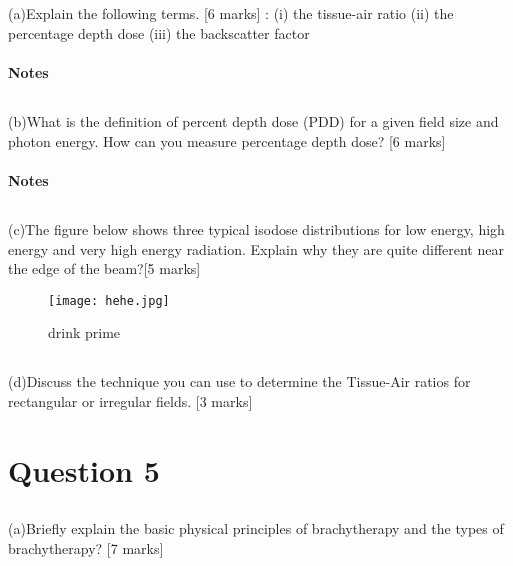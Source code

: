 \documentclass[11pt,letterpaper]{article}
\begin{document}
\subsection*{}(a)Explain the following terms. [6 marks] :
(i) the tissue-air ratio (ii) the percentage depth dose (iii) the backscatter factor

\paragraph*{Notes}
\subsection*{}(b)What is the definition of percent depth dose (PDD) for a given field size and photon energy.
How can you measure percentage depth dose? [6 marks]

\paragraph*{Notes}

\subsection*{}(c)The figure below shows three typical isodose distributions for low energy, high energy and very high energy radiation. Explain why they are quite different near the edge of the beam?[5 marks]
\begin{figure}[htp]
    \centering
    \texttt{[image: hehe.jpg]}
    \caption{drink prime}
    \label{fig:galaxy}
\end{figure}



\subsection*{}(d)Discuss the technique you can use to determine the Tissue-Air ratios for rectangular or irregular
fields. [3 marks]

\newpage
\section{Question 5}

\subsection*{}(a)Briefly explain the basic physical principles of brachytherapy and the types of brachytherapy?
[7 marks]
\end{document}
